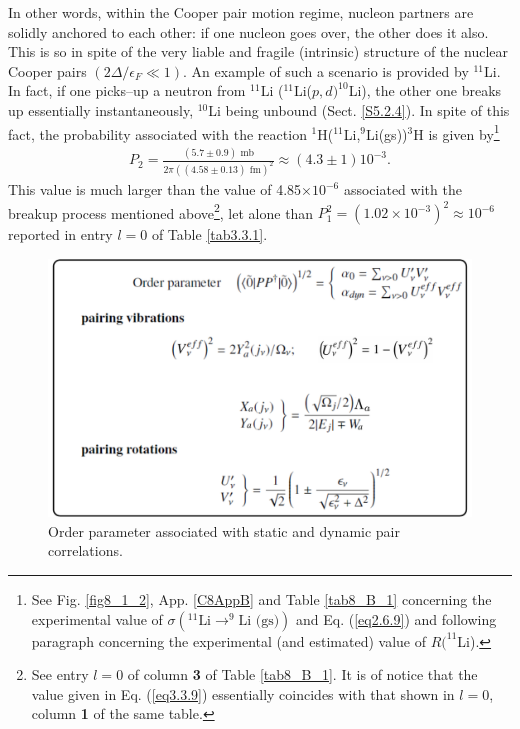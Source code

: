In other words, within the Cooper pair motion regime, nucleon partners are solidly anchored to each other: if one nucleon goes over, the other does it also. This is so in spite of the very liable and fragile (intrinsic) structure of the nuclear Cooper pairs $(2\Delta/\epsilon_F\ll1)$. An example of such a  scenario is  provided by $^{11}$Li. In fact, if one picks--up a neutron from $^{11}$Li ($^{11}$Li($p,d)^{10}$Li), the other one breaks up essentially instantaneously, $^{10}$Li being unbound (Sect. \ref{S5.2.4}). In spite of this fact, the probability associated with the reaction $^1$H($^{11}$Li,$^9$Li(gs))$^{3}$H is given by\footnote{See  Fig. \ref{fig8_1_2}, App. \ref{C8AppB} and Table \ref{tab8_B_1} concerning the experimental value of $\sigma(^{11}\text{Li}\to ^{9}\text{Li (gs)})$ and Eq. (\ref{eq2.6.9}) and following paragraph concerning the experimental (and estimated) value of $R(^{11}$Li).}
\begin{align}\label{eq3.3.9}
P_2=\frac{(5.7\pm0.9)\text{ mb}}{2\pi((4.58\pm0.13)\text{ fm})^2}\approx(4.3\pm1)10^{-3}.
\end{align}
This value is much larger than the value of 4.85$\times10^{-6}$ associated with the breakup process mentioned above\footnote{See entry $l=0$ of column \textbf{3} of Table \ref{tab8_B_1}. It is of notice that the value given in Eq. (\ref{eq3.3.9}) essentially coincides with that shown in $l=0$, column \textbf{1} of the same table.}, let alone than $P_1^2=(1.02\times10^{-3})^2\approx 10^{-6}$ reported in entry $l=0$ of Table \ref{tab3.3.1}.
\begin{figure}
\centerline{\includegraphics*[width=15cm,angle=0]{nutshell/figs/fig3_3_2.pdf}}
\caption{Order parameter associated with static and dynamic pair correlations.}\label{fig3.3.2}
\end{figure}
